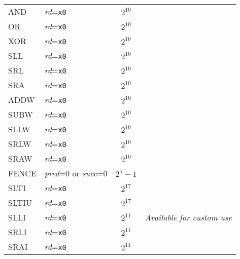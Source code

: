 \begin{table}[hbt]
\begin{tabular}{|l|l|c|l|}
  AND                   & {\em rd}={\tt x0}                           & $2^{10}$                    & \\ \cline{1-3}
  OR                    & {\em rd}={\tt x0}                           & $2^{10}$                    & \\ \cline{1-3}
  XOR                   & {\em rd}={\tt x0}                           & $2^{10}$                    & \\ \cline{1-3}
  SLL                   & {\em rd}={\tt x0}                           & $2^{10}$                    & \\ \cline{1-3}
  SRL                   & {\em rd}={\tt x0}                           & $2^{10}$                    & \\ \cline{1-3}
  SRA                   & {\em rd}={\tt x0}                           & $2^{10}$                    & \\ \cline{1-3}
  ADDW                  & {\em rd}={\tt x0}                           & $2^{10}$                    & \\ \cline{1-3}
  SUBW                  & {\em rd}={\tt x0}                           & $2^{10}$                    & \\ \cline{1-3}
  SLLW                  & {\em rd}={\tt x0}                           & $2^{10}$                    & \\ \cline{1-3}
  SRLW                  & {\em rd}={\tt x0}                           & $2^{10}$                    & \\ \cline{1-3}
  SRAW                  & {\em rd}={\tt x0}                           & $2^{10}$                    & \\ \cline{1-3}
  FENCE                 & {\em pred}=0 or {\em succ}=0                & $2^{5}-1$                   & \\ \hline \hline
  SLTI                  & {\em rd}={\tt x0}                           & $2^{17}$                    & \multirow{10}{*}{\em Available for custom use} \\ \cline{1-3}
  SLTIU                 & {\em rd}={\tt x0}                           & $2^{17}$                    & \\ \cline{1-3}
  SLLI                  & {\em rd}={\tt x0}                           & $2^{11}$                    & \\ \cline{1-3}
  SRLI                  & {\em rd}={\tt x0}                           & $2^{11}$                    & \\ \cline{1-3}
  SRAI                  & {\em rd}={\tt x0}                           & $2^{11}$                    & \\ \cline{1-3}

\end{tabular}
\end{table}
